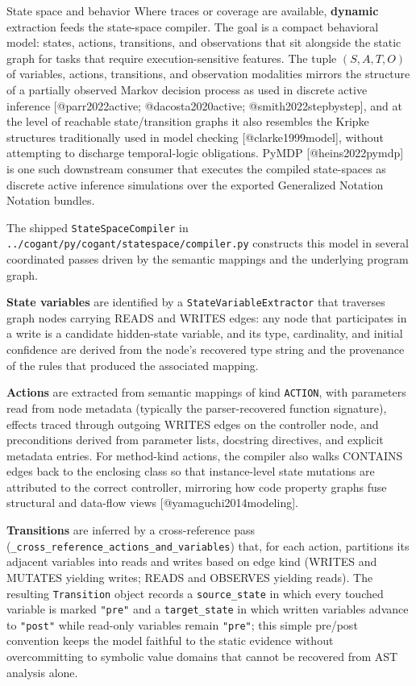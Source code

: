 \documentclass[
  ignorenonframetext,
]{beamer}
\begin{document}
\begin{frame}[fragile]{State space and behavior}
\protect{}\label{state-space-and-behavior}
Where traces or coverage are available, \textbf{dynamic} extraction
feeds the state-space compiler. The goal is a compact behavioral model:
states, actions, transitions, and observations that sit alongside the
static graph for tasks that require execution-sensitive features. The
tuple \((S, A, T, O)\) of variables, actions, transitions, and
observation modalities mirrors the structure of a partially observed
Markov decision process as used in discrete active inference
{[}@parr2022active; @dacosta2020active; @smith2022stepbystep{]}, and at
the level of reachable state/transition graphs it also resembles the
Kripke structures traditionally used in model checking
{[}@clarke1999model{]}, without attempting to discharge temporal-logic
obligations. PyMDP {[}@heins2022pymdp{]} is one such downstream consumer
that executes the compiled state-spaces as discrete active inference
simulations over the exported Generalized Notation Notation bundles.

The shipped \texttt{StateSpaceCompiler} in
\texttt{../cogant/py/cogant/statespace/compiler.py} constructs this
model in several coordinated passes driven by the semantic mappings and
the underlying program graph.

\textbf{State variables} are identified by a
\texttt{StateVariableExtractor} that traverses graph nodes carrying
READS and WRITES edges: any node that participates in a write is a
candidate hidden-state variable, and its type, cardinality, and initial
confidence are derived from the node's recovered type string and the
provenance of the rules that produced the associated mapping.

\textbf{Actions} are extracted from semantic mappings of kind
\texttt{ACTION}, with parameters read from node metadata (typically the
parser-recovered function signature), effects traced through outgoing
WRITES edges on the controller node, and preconditions derived from
parameter lists, docstring directives, and explicit metadata entries.
For method-kind actions, the compiler also walks CONTAINS edges back to
the enclosing class so that instance-level state mutations are
attributed to the correct controller, mirroring how code property graphs
fuse structural and data-flow views {[}@yamaguchi2014modeling{]}.

\textbf{Transitions} are inferred by a cross-reference pass
(\texttt{\_cross\_reference\_actions\_and\_variables}) that, for each
action, partitions its adjacent variables into reads and writes based on
edge kind (WRITES and MUTATES yielding writes; READS and OBSERVES
yielding reads). The resulting \texttt{Transition} object records a
\texttt{source\_state} in which every touched variable is marked
\texttt{"pre"} and a \texttt{target\_state} in which written variables
advance to \texttt{"post"} while read-only variables remain
\texttt{"pre"}; this simple pre/post convention keeps the model faithful
to the static evidence without overcommitting to symbolic value domains
that cannot be recovered from AST analysis alone.


\end{frame}
\end{document}
